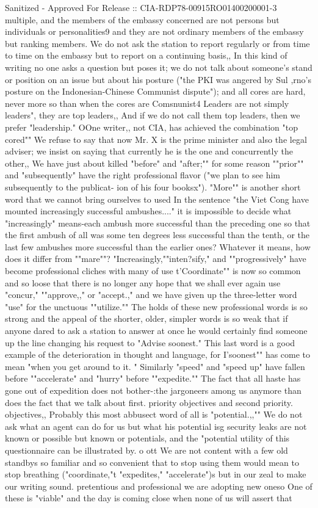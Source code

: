 \documentclass[
    oneside,
    11pt,
    draft
]{memoir}
\begin{document}
Sanitized - Approved For Release :: CIA-RDP78-00915RO01400200001-3 multiple, and the members of the embassy concerned are not persons but individuals or personalities9 and they are not ordinary members of the embassy but ranking members. We do not ask the station to report regularly or from time to time on the embassy but to report on a continuing basis,, In this kind of writing no one asks a question but poses it; we do not talk about someone's stand or position on an issue but about his posture ("the PKI was angered by Sul ,rno's posture on the Indonesian-Chinese Communist dispute"); and all cores are hard, never more so than when the cores are Comsnunist4 Leaders are not simply leaders", they are top leaders,, And if we do not call them top leaders, then we prefer "leadership." OOne writer,, not CIA, has achieved the combination "top cored"" We refuse to say that now Mr. X is the prime minister and also the legal adviser; we insist on saying that currently he is the one and concurrently the other,, We have just about killed "before" and "after;"" for some reason ""prior"" and "subsequently" have the right professional flavor ("we plan to see him subsequently to the publicat- ion of his four booksx"). "More"" is another short word that we cannot bring ourselves to used In the sentence "the Viet Cong have mounted increasingly successful ambushes...." it is impossible to decide what "increasingly" means-each ambush more successful than the preceding one so that the first ambush of all was some ten degrees less successful than the tenth, or the last few ambushes more successful than the earlier ones? Whatever it means, how does it differ from ""mare""? "Increasingly,""inten?sify," and ""progressively" have become professional cliches with many of use t'Coordinate"" is now so common and so loose that there is no longer any hope that we shall ever again use "concur," ""approve,," or "accept.," and we have given up the three-letter word "use" for the unctuous ""utilize."" The holds of these new professional words is so strong and the appeal of the shorter, older, simpler words is so weak that if anyone dared to ask a station to answer at once he would certainly find someone up the line changing his request to "Advise soonest." This last word is a good example of the deterioration in thought and language, for I'soonest"" has come to mean "when you get around to it. " Similarly "speed" and "speed up" have fallen before ""accelerate" and "hurry" before ""expedite."" The fact that all haste has gone out of expedition does not bother-:the jargoneers among us anymore than does the fact that we talk about first. priority objectives and second priority. objectives,, Probably this most abbusect word of all is "potential.,,"" We do not ask what an agent can do for us but what his potential isg security leaks are not known or possible but known or potentials, and the "potential utility of this questionnaire can be illustrated by. o ott We are not content with a few old standbys so familiar and so convenient that to stop using them would mean to stop breathing ("coordinate,"t "expedites," "accelerate")s but in our zeal to make our writing sound. pretentious and professional we are adopting new oneso One of these is "viable" and the day is coming close when none of us will assert that 
\end{document}
